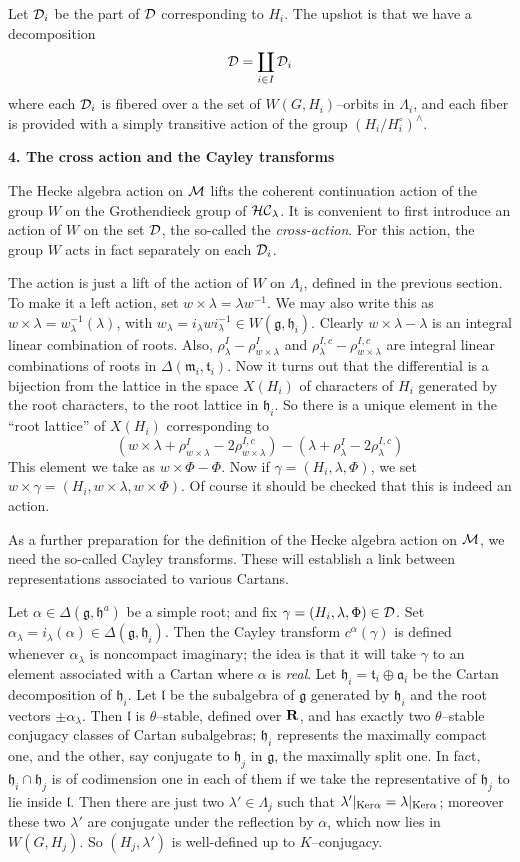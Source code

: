 \documentclass[11 pt]{article}
\def\1{^{-1}}
\def\a{\alpha}
\def\af{{\mathfrak a}}
\def\D{{\cal D}}
\def\F{\Phi}
\def\g{\gamma}
\def\gf{{\mathfrak g}}
\def\HC{{\cal HC}}
\def\hf{{\mathfrak h}}
\def\Ker{{\rm Ker}}
\def\L{\Lambda}
\def\l{\lambda}
\def\lf{{\mathfrak l}}
\def\M{{\cal M}}
\def\mf{{\mathfrak m}}
\def\R{{\bf R}}
\def\t{\theta}
\def\tf{{\mathfrak t}}
\begin{document}
Let $\D_i$ be the part of $\D$ corresponding to $H_i$. The upshot is that we 
have a decomposition
$$
\D=\coprod_{i\in I}\D_i
$$
where each $\D_i$ is fibered over a the set of $W(G,H_i)$--orbits
in $\L_i$, and each fiber is provided with a simply transitive action of the 
group $(H_i/H_i^\circ)^{\wedge}$.

\bigskip

\noindent\textbf{4. The cross action and the Cayley transforms}

\medskip

The Hecke algebra action on $\M$ lifts the coherent 
continuation action of the group $W$ on the Grothendieck group of $\HC_\l$. 
It is convenient to first introduce an action of $W$ on the set $\D$, the 
so-called the \textit{cross-action}. For this action, the group $W$ acts in 
fact separately on each $\D_i$.

The action is just a lift of the action of $W$ on $\L_i$, defined in the 
previous section. To make it a left action, set $w\times\l=\l w\1$. We may
also write this as $w\times\l=w_\l\1(\l)$, with $w_\l=i_\l wi_\l\1\in 
W(\gf,\hf_i)$. Clearly $w\times\l-\l$ is an integral linear combination of
roots. Also, $\rho^I_\l-\rho^I_{w\times\l}$ and 
$\rho^{I,c}_\l-\rho^{I,c}_{w\times\l}$ are integral linear combinations of
roots in $\Delta(\mf_i,\tf_i)$. Now it turns out that the differential is
a bijection from the lattice in the space $X(H_i)$ of characters of $H_i$ 
generated by the root characters, to the root lattice in $\hf_i$. So there is 
a unique element in the ``root lattice'' of $X(H_i)$ corresponding to
$$
(w\times\l+\rho^I_{w\times\l}-2\rho^{I,c}_{w\times\l})
-(\l+\rho^I_\l-2\rho^{I,c}_\l)
$$
This element we take as $w\times\F-\F$. Now if $\g=(H_i,\l,\F)$, we set
$w\times\g=(H_i,w\times\l,w\times\F)$. Of course it should be checked that 
this is indeed an action.

\medskip

As a further preparation for the definition of the Hecke algebra action on 
$\M$, we need the so-called Cayley transforms. These will establish a link 
between representations associated to various Cartans.

Let $\a\in\Delta(\gf,\hf^a)$ be a simple root; and fix $\g=(H_i,\l,\F)\in\D$.
Set $\a_\l=i_\l(\a)\in\Delta(\gf,\hf_i)$. Then the Cayley transform $c^\a(\g)$
is defined whenever $\a_\l$ is noncompact imaginary; the idea is that it will
take $\g$ to an element associated with a Cartan where $\a$ is {\em real}. Let
$\hf_i=\tf_i\oplus\af_i$ be the Cartan decomposition of $\hf_i$. Let $\lf$ be
the subalgebra of $\gf$ generated by $\hf_i$ and the root vectors $\pm\a_\l$.
Then $\lf$ is $\t$--stable, defined over $\R$, and has exactly two $\t$--stable
conjugacy classes of Cartan subalgebras; $\hf_i$ represents the maximally
compact one, and the other, say conjugate to $\hf_j$ in $\gf$, the maximally
split one. In fact, $\hf_i\cap\hf_j$ is of codimension one in each of them
if we take the representative of $\hf_j$ to lie inside $\lf$. Then there are
just two $\l'\in\L_j$ such that $\l'|_{\Ker\a}=\l|_{\Ker\a}$; moreover these
two $\l'$ are conjugate under the reflection by $\a$, which now lies in
$W(G,H_j)$. So $(H_j,\l')$ is well-defined up to $K$--conjugacy.
\end{document}
